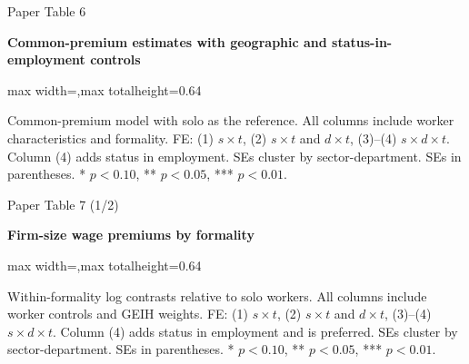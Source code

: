 \begin{frame}{Paper Table 6}
\begin{minipage}{\textwidth}\small\textbf{Common-premium estimates with geographic and status-in-employment controls}\end{minipage}\par\vspace{0.15cm}
\centering\begingroup\fontsize{8.5}{10}\selectfont
\setlength{\tabcolsep}{4pt}\renewcommand{\arraystretch}{1.06}
\begin{adjustbox}{max width=\textwidth,max totalheight=0.64\textheight}

\end{adjustbox}\endgroup\par\vspace{0.10cm}
{\fontsize{6.5}{7.5}\selectfont\raggedright Common-premium model with solo as the reference. All columns include worker characteristics and formality. FE: (1) $s\times t$, (2) $s\times t$ and $d\times t$, (3)--(4) $s\times d\times t$. Column (4) adds status in employment. SEs cluster by sector-department. SEs in parentheses. * $p<0.10$, ** $p<0.05$, *** $p<0.01$.\par}
\end{frame}

\begin{frame}{Paper Table 7 (1/2)}
\begin{minipage}{\textwidth}\small\textbf{Firm-size wage premiums by formality}\end{minipage}\par\vspace{0.15cm}
\centering\begingroup\fontsize{8.5}{10}\selectfont
\setlength{\tabcolsep}{4pt}\renewcommand{\arraystretch}{1.06}
\begin{adjustbox}{max width=\textwidth,max totalheight=0.64\textheight}

\end{adjustbox}\endgroup\par\vspace{0.10cm}
{\fontsize{6.5}{7.5}\selectfont\raggedright Within-formality log contrasts relative to solo workers. All columns include worker controls and GEIH weights. FE: (1) $s\times t$, (2) $s\times t$ and $d\times t$, (3)--(4) $s\times d\times t$. Column (4) adds status in employment and is preferred. SEs cluster by sector-department. SEs in parentheses. * $p<0.10$, ** $p<0.05$, *** $p<0.01$.\par}
\end{frame}

